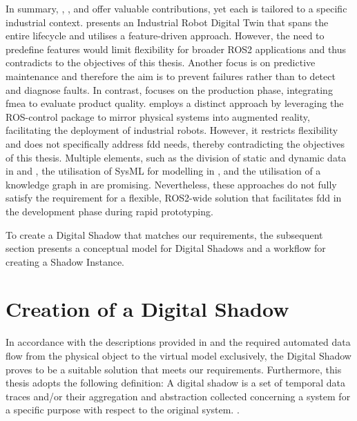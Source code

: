 In summary, \Textcite{IndustrialRobotDigitalTwin}, \Textcite{DSforLowDelayAnalysisOfProdQualityRisk}, and \Textcite{ROSIE} offer valuable contributions, yet each is tailored to a specific industrial context. \Textcite{IndustrialRobotDigitalTwin} presents an Industrial Robot Digital Twin that spans the entire lifecycle and utilises a feature-driven approach. However, the need to predefine features would limit flexibility for broader ROS2 applications and thus contradicts to the objectives of this thesis. Another focus is on predictive maintenance and therefore the aim is to prevent failures rather than to detect and diagnose faults. In contrast, \Textcite{DSforLowDelayAnalysisOfProdQualityRisk} focuses on the production phase, integrating \acl{fmea} to evaluate product quality. \Textcite{ROSIE} employs a distinct approach by leveraging the ROS-control package to mirror physical systems into augmented reality, facilitating the deployment of industrial robots. However, it restricts flexibility and does not specifically address \acl{fdd} needs, thereby contradicting the objectives of this thesis. \newline
Multiple elements, such as the division of static and dynamic data in \Textcite{IndustrialRobotDigitalTwin} and \Textcite{DSforLowDelayAnalysisOfProdQualityRisk}, the utilisation of SysML for modelling in \Textcite{IndustrialRobotDigitalTwin}, and the utilisation of a knowledge graph in \Textcite{DSforLowDelayAnalysisOfProdQualityRisk} are promising. Nevertheless, these approaches do not fully satisfy the requirement for a flexible, ROS2-wide solution that facilitates \acl{fdd} in the development phase during rapid prototyping.

To create a Digital Shadow that matches our requirements, the subsequent section presents a conceptual model for Digital Shadows and a workflow for creating a Shadow Instance.

\section{Creation of a Digital Shadow} \label{sec:createDShadows}
In accordance with the descriptions provided in  and the required automated data flow from the physical object to the virtual model exclusively, the Digital Shadow proves to be a suitable solution that meets our requirements. Furthermore, this thesis adopts the following definition:
\glqq{}A digital shadow is a set of temporal data traces and/or their aggregation and abstraction collected concerning a system for a specific purpose with respect to the original system.\grqq{} \cite[p.~3]{DSDTDefinition}.


